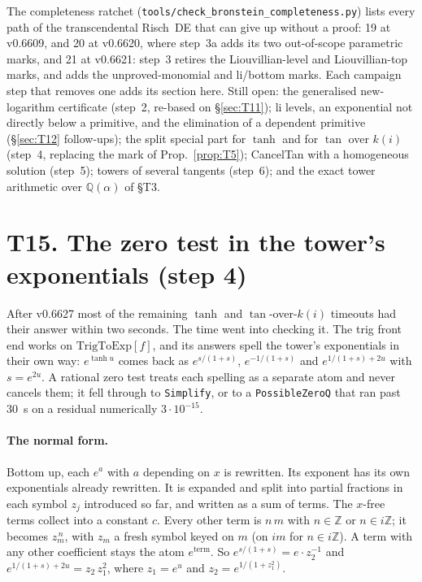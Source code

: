 \documentclass[11pt]{article}
\theoremstyle{definition}
\theoremstyle{remark}
\newcommand{\Q}{\mathbb{Q}}
\newcommand{\Z}{\mathbb{Z}}
\newcommand{\code}[1]{\texttt{#1}}
\begin{document}
The completeness ratchet (\code{tools/check\_bronstein\_completeness.py}) lists every
path of the transcendental Risch~DE that can give up without a proof: 19 at v0.6609, and
20 at v0.6620, where step~3a adds its two out-of-scope parametric marks, and 21 at
v0.6621: step~3 retires the Liouvillian-level and Liouvillian-top marks, and adds the
unproved-monomial and li/bottom marks.
Each campaign step that removes one adds its section here. Still open: the generalised
new-logarithm certificate (step~2, re-based on \S\ref{sec:T11}); li levels, an exponential
not directly below a primitive, and the elimination of a dependent primitive
(\S\ref{sec:T12} follow-ups); the split special part for $\tanh$ and for $\tan$ over $k(i)$ (step~4,
replacing the mark of Prop.~\ref{prop:T5}); CancelTan with a homogeneous solution
(step~5); towers of several tangents (step~6); and the exact tower arithmetic over
$\Q(\alpha)$ of \S T3.

\section*{T15. The zero test in the tower's exponentials (step 4)}
\label{sec:T15}

After v0.6627 most of the remaining $\tanh$ and $\tan$-over-$k(i)$ timeouts had their
answer within two seconds. The time went into checking it. The trig front end works on
$\mathrm{TrigToExp}[f]$, and its answers spell the tower's exponentials in their own way:
$e^{\tanh u}$ comes back as $e^{s/(1+s)}$, $e^{-1/(1+s)}$ and $e^{1/(1+s)+2u}$ with
$s=e^{2u}$. A rational zero test treats each spelling as a separate atom and never
cancels them; it fell through to \code{Simplify}, or to a \code{PossibleZeroQ} that ran
past 30~s on a residual numerically $3\cdot10^{-15}$.

\paragraph{The normal form.} Bottom up, each $e^{a}$ with $a$ depending on $x$ is
rewritten. Its exponent has its own exponentials already rewritten. It is expanded and
split into partial fractions in each symbol $z_j$ introduced so far, and written as a sum of
terms. The $x$-free terms collect into a constant $c$. Every other term is $n\,m$ with
$n\in\Z$ or $n\in i\Z$; it becomes $z_m^{\,n}$, with $z_m$ a fresh symbol keyed on $m$ (on
$i m$ for $n\in i\Z$). A term with any other coefficient stays the atom $e^{\text{term}}$.
So $e^{s/(1+s)}=e\cdot z_2^{-1}$ and $e^{1/(1+s)+2u}=z_2\,z_1^{2}$, where
$z_1=e^{u}$ and $z_2=e^{1/(1+z_1^2)}$.
\end{document}
